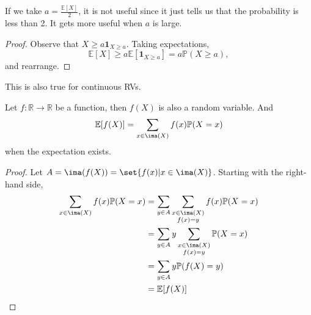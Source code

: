 \begin{remark}
    If we take \(a = \frac{\mathbb{E}[X]}{2}\), it is not useful since it just tells us that the probability is less than 2. It gets more useful when \(a\) is large.
\end{remark}
\begin{proof}
    Observe that \(X \geq a \textbf{1}_{X \geq a}\). Taking expectations,
    \[
        \mathbb{E}[X] \geq a \mathbb{E}[\textbf{1}_{X \geq a}] = a \mathbb{P}(X \geq a),
    \]
    and rearrange.
\end{proof}
\begin{remark}
    This is also true for continuous RVs.
\end{remark}
\begin{proposition}{}{}
    Let \(f: \mathbb{R} \to \mathbb{R}\) be a function, then \(f(X)\) is also a random variable. And
    \[
        \mathbb{E}[f(X)] = \sum_{x \in \ima(X)} f(x) \mathbb{P}(X = x)
    \]
    when the expectation exists.
\end{proposition}
\begin{proof}
    Let \(A = \ima(f(X)) = \set{f(x) | x\in \ima(X)}\). Starting with the right-hand side,
    \begin{align*}
        \sum_{x \in \ima(X)} f(x) \mathbb{P}(X = x) &= \sum_{y \in A}\sum_{\substack{x \in \ima(X)\\f(x) = y}}f(x) \mathbb{P}(X = x)\\
        &= \sum_{y \in A}y\sum_{\substack{x \in \ima(X)\\f(x) = y}}\mathbb{P}(X = x)\\
        &= \sum_{y \in A} y \mathbb{P}(f(X) = y)\\
        &= \mathbb{E}[f(X)]
    \end{align*}
\end{proof}

